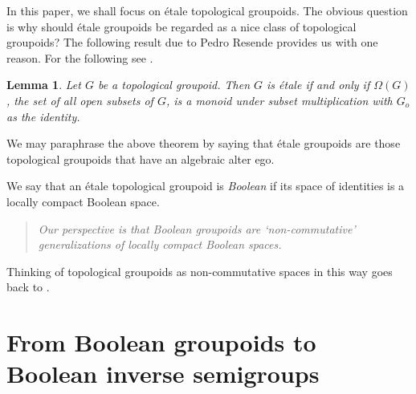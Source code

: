 \documentclass[a4paper]{amsart}
\newtheorem{lemma}[theorem]{Lemma}
\begin{document}




In this paper, we shall focus on \'etale topological groupoids.
The obvious question is why should \'etale groupoids be regarded as a nice class of topological groupoids?
The following result due to Pedro Resende provides us with one reason.
For the following see \cite[Exercises I.1.8]{Resende}.

\begin{lemma}\label{lem:rally} Let $G$ be a topological groupoid.
Then $G$ is \'etale if and only if $\Omega (G)$, the set of all open subsets of $G$, is a monoid under subset multiplication with $G_{o}$ as the identity.
\end{lemma}

We may paraphrase the above theorem by saying that \'etale groupoids are those topological groupoids that have an algebraic alter ego.

We say that an \'etale topological groupoid is {\em Boolean} if its space of identities is a locally compact Boolean space.
\begin{quote}
{\em Our perspective is that Boolean groupoids are `non-commutative' generalizations of locally compact Boolean spaces.}
\end{quote}
Thinking of topological groupoids as non-commutative spaces in this way goes back to \cite{K, Renault}.


\section{From Boolean groupoids to Boolean inverse semigroups}
\end{document}
